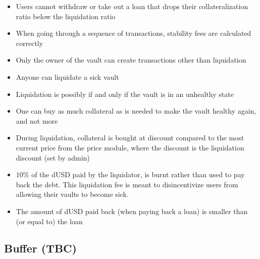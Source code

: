 \documentclass{article} %
\begin{document}
\begin{itemize}
  \item Users cannot withdraw or take out a loan that drops their
    collateralization ratio below the liquidation ratio
  \item When going through a sequence of transactions, stability fees are
    calculated correctly
  \item Only the owner of the vault can create transactions other than
    liquidation
  \item Anyone can liquidate a sick vault
  \item Liquidation is possibly if and only if the vault is in an unhealthy
    state
  \item One can buy as much collateral as is needed to make the vault healthy
    again, and not more
  \item During liquidation, collateral is bought at discount compared to the
    most current price from the price module, where the discount is the
    liquidation discount (set by admin)
  \item $10\%$ of the dUSD paid by the liquidator, is burnt rather than used to
    pay back the debt. This liquidation fee is meant to disincentivize users
    from allowing their vaults to become sick.
  \item The amount of dUSD paid back (when paying back a loan) is smaller than
    (or equal to) the loan
\end{itemize}







\subsection{Buffer (TBC)}
\end{document}
